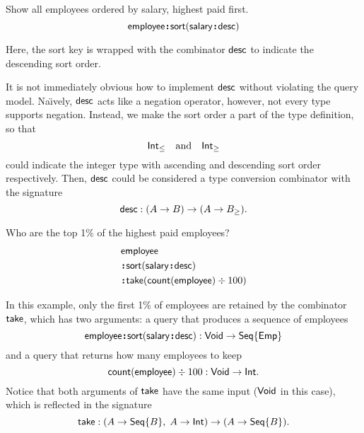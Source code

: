 \begin{demo}
    \label{ex:sort-employee-by-salary-desc}
    Show all employees ordered by salary, highest paid first.
    \begin{equation*}
        \mathsf{employee}\!\boldsymbol{:}\!\mathsf{sort}(\mathsf{salary}\!\boldsymbol{:}\!\mathsf{desc})
    \end{equation*}
\end{demo}

Here, the sort key is wrapped with the combinator $\mathsf{desc}$ to indicate the
descending sort order.

It is not immediately obvious how to implement $\mathsf{desc}$ without violating the
query model.  Na\"{\i}vely, $\mathsf{desc}$ acts like a negation operator, however, not
every type supports negation.  Instead, we make the sort order a part of the
type definition, so that
\begin{equation*}
    \mathsf{Int}_{\le} \quad\text{and}\quad \mathsf{Int}_{\ge}
\end{equation*}
could indicate the integer type with ascending and descending sort order
respectively.  Then, $\mathsf{desc}$ could be considered a type conversion combinator
with the signature
\begin{equation*}
    \mathsf{desc} : (A \to B) \to (A \to B_{\ge}).
\end{equation*}

\begin{demo}
    \label{ex:sort-employee-by-salary-take-top}
    Who are the top 1\% of the highest paid employees?
    \begin{align*}
        & \mathsf{employee} \\
        & \!\boldsymbol{:}\!\mathsf{sort}(\mathsf{salary}\!\boldsymbol{:}\!\mathsf{desc}) \\
        & \!\boldsymbol{:}\!\mathsf{take}(\mathsf{count}(\mathsf{employee})\mathbin \div 100)
    \end{align*}
\end{demo}

In this example, only the first 1\% of employees are retained by the combinator
$\mathsf{take}$, which has two arguments: a query that produces a sequence of employees
\begin{equation*}
    \mathsf{employee}\!\boldsymbol{:}\!\mathsf{sort}(\mathsf{salary}\!\boldsymbol{:}\!\mathsf{desc}) : \mathsf{Void} \to \mathsf{Seq}{\left\{\mathsf{Emp}\right\}}
\end{equation*}
and a query that returns how many employees to keep
\begin{equation*}
    \mathsf{count}(\mathsf{employee}) \div 100 : \mathsf{Void} \to \mathsf{Int}.
\end{equation*}
Notice that both arguments of $\mathsf{take}$ have the same input ($\mathsf{Void}$ in this
case), which is reflected in the signature
\begin{equation*}
    \mathsf{take} : (A \to \mathsf{Seq}{\left\{B\right\}},\; A \to \mathsf{Int}) \to (A \to \mathsf{Seq}{\left\{B\right\}}).
\end{equation*}

